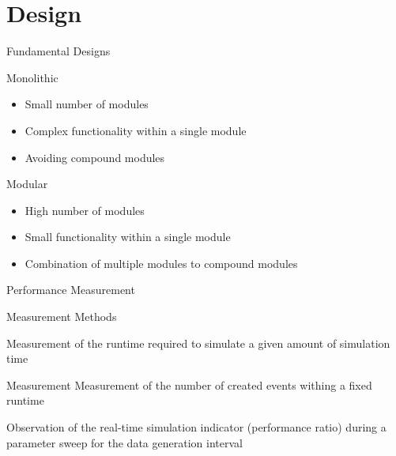 \section{Design}
\begin{frame}{Fundamental Designs}
    \begin{block}{Monolithic}
        \begin{itemize}
            \item Small number of modules
            \item Complex functionality within a single module
            \item Avoiding compound modules
        \end{itemize}
    \end{block}
    \begin{block}{Modular}
        \begin{itemize}
            \item High number of modules
            \item Small functionality within a single module
            \item Combination of multiple modules to compound modules
        \end{itemize}
    \end{block}
\end{frame}

\begin{frame}{Performance Measurement}
    \begin{block}{Measurement Methods}
        \begin{description}
            \item[runtime] Measurement of the runtime required to simulate a given amount of simulation time
            \item[created events] Measurement Measurement of the number of created events withing a fixed runtime
            \item[real-time] Observation of the real-time simulation indicator (performance ratio) during a parameter sweep for the data generation interval
        \end{description}
    \end{block}
\end{frame}

